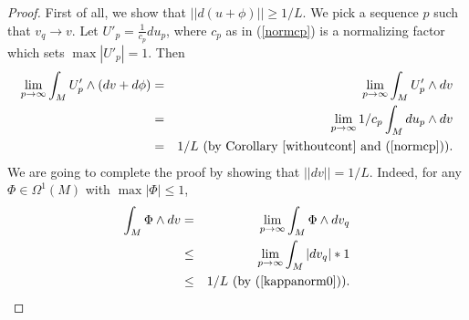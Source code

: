 \documentclass{ip-journal}
\theoremstyle{definition}
\numberwithin{equation}{section}
\begin{document}
\begin{proof} First of all, we show that $||d(u + \phi)|| \geq 1/L$.
  We pick a sequence $p$ such that $v_q \rightarrow v$.  Let $U'_p = \frac{1}{c_p}du_p$, where $c_p$ as in (\ref{normcp})
is a normalizing factor which sets  $\max |U'_p|=1$.  Then
\begin{eqnarray*} 
\lim_{p \rightarrow \infty} \int_M U'_p \wedge (dv + d\phi)   &=& \lim_{p \rightarrow \infty} \int_M U'_p \wedge dv \\
&=& \lim_{p \rightarrow \infty} 1/{c_p} \int_M    du_p \wedge dv\\
&=& 1/L  \ (\mbox{by   Corollary~\ref{withoutcont} and (\ref{normcp})}).
\end{eqnarray*}
We are going to complete the proof by showing that $||dv|| = 1/L$. Indeed, for any $\Phi \in\Omega^1(M)$ with $\max | \Phi| \leq 1$,
\begin{eqnarray*}
\int_M   \Phi \wedge dv &=& 
\lim_{p \rightarrow \infty}    \int_M   \Phi \wedge dv_q  \\
    &\leq&   \lim_{p \rightarrow \infty}  \int_M |dv_q|*1\\
    &\leq& 1/L \ (\mbox{by} \  (\ref{kappanorm0})).
\end{eqnarray*}
\end{proof}
\end{document}
